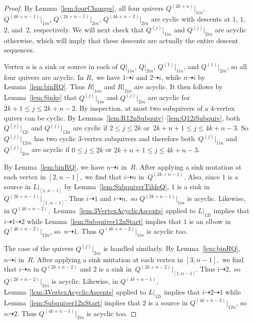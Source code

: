 \documentclass[11pt, letterpaper]{amsart}
\theoremstyle{definition}
\numberwithin{equation}{section}
\newcommand{\T}[2]{\mu[#1](#2)} %
\newcommand{\points}{\!\dasharrow\!}
\begin{document}
\begin{proof}
By Lemma~\ref{lem:fourChanges}, all four quivers $Q^{(2k+n)}|_{1in}$, $Q^{(4k+n-1)}|_{1in}$, $Q^{(2k+n-1)}|_{2in}$, $Q^{(4k+n-2)}|_{2in}$ are cyclic with descents at $1$, $1$, $2$, and~$2$, respectively. 
We will next check that $Q^{(j)}|_{1in}$ and $Q^{(j)}|_{2in}$ are acyclic otherwise, 
which will imply that these descents are actually the entire descent sequences.

Vertex $n$ is a sink or source in each of $Q|_{1in}$, $Q|_{2in}$, $Q^{(1)}|_{1in}$, and $Q^{(1)}|_{2in}$, so all four quivers are acyclic. %
In $R,$ we have $1 \points i$ and $2 \points i$, while $n \points i$ by Lemma~\ref{lem:binRQ}. 
Thus $R|_{1in}$ and $R|_{2in}$ are acyclic. 
It then follows by Lemma~\ref{lem:Sinks} that $Q^{(j)}|_{1in}$ and $Q^{(j)}|_{2in}$ are acyclic for~${2k+1 \le j \le 2k+n-2.}$
By inspection, at most two subquivers of a $4$-vertex quiver can be cyclic. 
By Lemmas~\ref{lem:R12nSubquiv}--\ref{lem:Q12iSubquiv}, both $Q^{(j)}|_{12i}$ and $Q^{(j)}|_{12n}$ are cyclic if ${2\le j \le2k}$ or~${2k+n+1 \le j \le 4k+n-3}$. 
So $Q^{(j)}|_{12in}$ has two cyclic $3$-vertex subquivers and therefore both~$Q^{(j)}|_{1in}$ and $Q^{(j)}|_{2in}$ are acyclic if
${0 \le j \le 2k}$ or ${2k+n+1 \le j \le 4k+n-3}$.

By Lemma~\ref{lem:binRQ}, we have $n \points i$ in~$R$. After applying a sink mutation at each vertex in $[2,n-\!1],$ we find that $i \points n$ in~$Q^{(2k+n-1)}$. 
Also, since $1$ is a source in $L|_{[1,n-1]}$ by Lemma~\ref{lem:SubquiverTildeQ}, $1$ is a sink in~$Q^{(2k+n-1)}|_{[1,n-1]}$. 
Thus $i \points 1$ and $i \points n,$ so $Q^{(2k+n-1)}|_{1in}$ is acyclic. 
Likewise, in $Q^{(4k+n-2)},$ Lemma~\ref{lem:3VertexAcyclicAscents} applied to $L|_{12i}$ implies that $i \points 1 \points 2$ %
while Lemma~\ref{lem:Subquiver12nStart} implies that $1$ is an elbow in $Q^{(4k+n-2)}|_{12n}$, %
so~$n \points 1$. Thus $Q^{(4k+n-2)}|_{1in}$ is acyclic too.

The case of the quivers $Q^{(j)}|_{2in}$ is handled similarly. 
By Lemma~\ref{lem:binRQ}, $n \points i$ in~$R$. After applying a sink mutation at each vertex in ${[3,n-1]},$ we find that $i \points n$ in $Q^{(2k+n-2)}$ and $2$ is a sink in~$Q^{(2k+n-2)}|_{[1,n-1]}$. 
Thus ${i \points 2},$ so $Q^{(2k+n-2)}|_{2in}$ is acyclic. 
Likewise, in $Q^{(4k+n-1)},$ Lemma~\ref{lem:3VertexAcyclicAscents} applied to $L|_{12i}$ implies that $i \points 2 \points 1$ while Lemma~\ref{lem:Subquiver12nStart} implies that $2$ is a source in $Q^{(4k+n-2)}|_{12n}$, so~$n \points 2$. 
Thus $Q^{(4k+n-1)}|_{2in}$ is acyclic too.
\end{proof}
\end{document}
